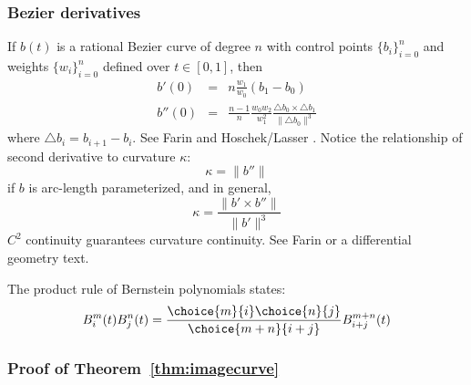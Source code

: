 \documentclass[12pt]{article}
\begin{document}
\subsubsection{Bezier derivatives}

If $b(t)$ is a rational Bezier curve of degree $n$ 
with control points $\{b_i\}_{i=0}^n$ and 
weights $\{w_i\}_{i=0}^n$ defined over $t \in [0,1]$, then 
\begin{eqnarray}
\label{eqn:firstderiv}
b'(0) & = & n \frac{w_1}{w_0} (b_1 - b_0) \\
\label{eqn:secondderiv}
b''(0) & = & \frac{n-1}{n} \frac{w_0 w_2}{w_1^2} 
             \frac{\triangle b_0 \times \triangle b_1}{\| \triangle b_0\|^3}
\end{eqnarray}
where $\triangle b_i = b_{i+1} - b_i$.
See Farin \cite{farin02} and Hoschek/Lasser \cite{hoschekLasser0?}. 
Notice the relationship of second derivative to curvature $\kappa$:
\[
    \kappa = \|b''\|
\]
if $b$ is arc-length parameterized, and in general,
\[
    \kappa = \frac{\| b' \times b'' \|}{\| b' \|^3}
\]
$C^2$ continuity guarantees curvature continuity.
See Farin \cite{farin02} or a differential geometry text.

The product rule of Bernstein polynomials \cite{farin02} states:
\[
B_i^m(t) B_j^n(t) = \frac{\choice{m}{i} \choice{n}{j}}{\choice{m+n}{i+j}} B_{i+j}^{m+n}(t)
\]

\clearpage

\subsubsection{Proof of Theorem~\ref{thm:imagecurve}}
\end{document}
